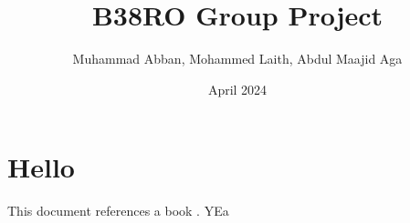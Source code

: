 \documentclass{report}
\begin{document}
\title{B38RO Group Project}
\author{Muhammad Abban, Mohammed Laith, Abdul Maajid Aga}
\date{April 2024}
\maketitle

\tableofcontents

\chapter{Hello}

This document references a book \autocite{craigIntroductionRoboticsMechanics2014}. YEa

\printbibliography
\end{document}
